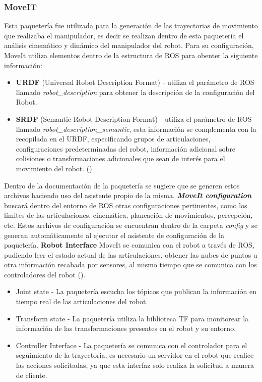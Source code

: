             \subsubsection{MoveIT}
            Esta paquetería fue utilizada para la generación de las trayectorias de movimiento que realizaba el manipulador, es decir se realizan dentro de esta paquetería el análisis cinemático y dinámico del manipulador del robot. Para su configuración, MoveIt utiliza elementos dentro de la estructura de ROS para obenter la siguiente información: 
            \begin{itemize}
                \item \textbf{URDF} (Universal Robot Description Format) - utiliza el parámetro de ROS llamado \textit{robot\_description} para obtener la descripción de la configuración del Robot. 
                \item \textbf{SRDF} (Semantic Robot Description Format) - utiliza el parámetro de ROS llamado \textit{robot\_description\_semantic}, esta información se complementa con la recopilada en el URDF, especificando grupos de articulaciones, configuraciones predeterminadas del robot, información adicional sobre colisiones o transformaciones adicionales que sean de interés para el movimiento del robot. (\cite*{ROS_concepts_MoveIt}) 
            \end{itemize}                
                Dentro de la documentación de la paquetería se sugiere que se generen estos archivos haciendo uso del asistente propio de la misma. \textbf{\textit{MoveIt configuration}} buscará dentro del entorno de ROS otras configuraciones pertinentes, como los límites de las articulaciones, cinemática, planeación de movimientos, percepción, etc. Estos archivos de configuración se encuentran dentro de la carpeta \textit{config} y se generan automáticamente al ejecutar el asistente de configuración de la paquetería.
            \textbf{Robot Interface}
             MoveIt se comunica con el robot a través de ROS, pudiendo leer el estado actual de las articulaciones, obtener las nubes de puntos u otra información recabada por sensores, al mismo tiempo que se comunica con los controladores del robot (\cite{ROS_concepts_MoveIt}).
             \begin{itemize}
                 \item Joint state - La paquetería escucha los tópicos que publican la información en tiempo real de las articulaciones del robot.
                 \item Transform state - La paquetería utiliza la biblioteca TF para monitorear la información de las transformaciones presentes en el robot y su entorno.
                 \item Controller Interface - La paquetería se comunica con el controlador para el seguimiento de la trayectoria, es necesario un servidor en el robot que realice las acciones solicitadas, ya que esta interfaz solo realiza la solicitud a manera de cliente.
             \end{itemize}
             
